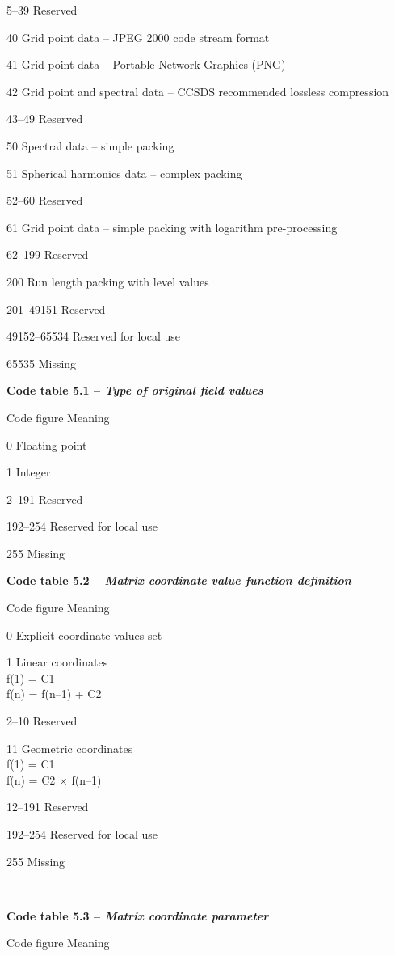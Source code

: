 5--39 Reserved

40 Grid point data -- JPEG 2000 code stream format

41 Grid point data -- Portable Network Graphics (PNG)

42 Grid point and spectral data -- CCSDS recommended lossless compression

43--49 Reserved

50 Spectral data -- simple packing

51 Spherical harmonics data -- complex packing

52--60 Reserved

61 Grid point data -- simple packing with logarithm pre-processing

62--199 Reserved

200 Run length packing with level values

201--49151 Reserved

49152--65534 Reserved for local use

65535 Missing

\textbf{Code table 5.1 -- \emph{Type of original field values}}

Code figure Meaning

0 Floating point

1 Integer

2--191 Reserved

192--254 Reserved for local use

255 Missing

\textbf{Code table 5.2 -- \emph{Matrix coordinate value function definition}}

Code figure Meaning

0 Explicit coordinate values set

1 Linear coordinates\\
f(1) = C1\\
f(n) = f(n--1) + C2

2--10 Reserved

11 Geometric coordinates\\
f(1) = C1\\
f(n) = C2 × f(n--1)

12--191 Reserved

192--254 Reserved for local use

255 Missing

\textbf{\\
}

\textbf{Code table 5.3 -- \emph{Matrix coordinate parameter}}

Code figure Meaning

